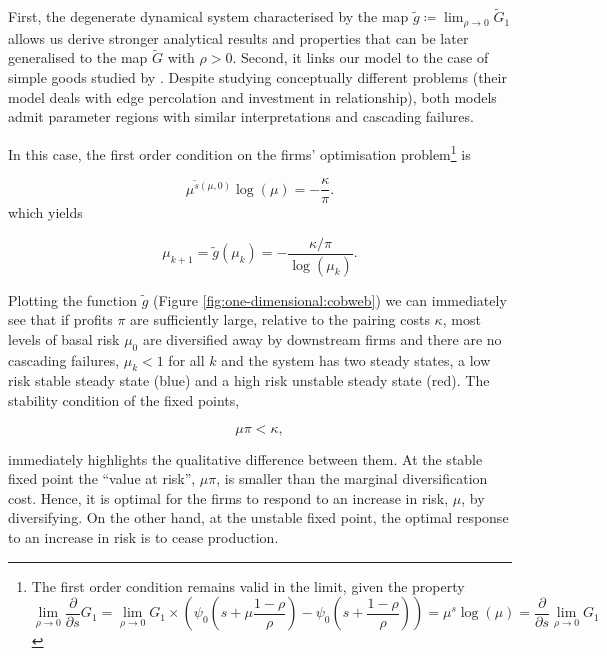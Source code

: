\documentclass[../../main.tex]{subfiles}
\begin{document}
First, the degenerate dynamical system characterised by the map $\tilde{g} \coloneqq \lim_{\rho \to 0} \tilde{G}_1$ allows us derive stronger analytical results and properties that can be later generalised to the map $\tilde{G}$ with $\rho > 0$. Second, it links our model to the case of simple goods studied by . Despite studying conceptually different problems (their model deals with edge percolation and investment in relationship), both models admit parameter regions with similar interpretations and cascading failures.

In this case, the first order condition on the firms' optimisation problem\footnote{
  The first order condition remains valid in the limit, given the property
  \begin{equation}
    \lim_{\rho \rightarrow 0} \frac{\partial}{\partial s}G_1 = \lim_{\rho \rightarrow 0} G_1 \times \left(\psi_0\left(s + \mu \frac{1 - \rho}{\rho} \right) - \psi_0\left(s + \frac{1 - \rho}{\rho} \right) \right) = \mu^{s} \log(\mu) = \frac{\partial}{\partial s} \lim_{\rho \rightarrow 0} G_1
  \end{equation}
} is

\begin{equation} \label{eq:one-dimension:foc}
  \mu^{\tilde{s}(\mu, 0)} \log(\mu) = -\frac{\kappa}{\pi}.
\end{equation} which yields

\begin{equation}
  \mu_{k+1} = \tilde{g}(\mu_k) = -\frac{\kappa / \pi}{\log(\mu_k)}.
\end{equation}

Plotting the function $\tilde{g}$ (Figure \ref{fig:one-dimensional:cobweb}) we can immediately see that if profits $\pi$ are sufficiently large, relative to the pairing costs $\kappa$, most levels of basal risk $\mu_0$ are diversified away by downstream firms and there are no cascading failures, $\mu_k < 1$ for all $k$ and the system has two steady states, a low risk stable steady state (blue) and a high risk unstable steady state (red). The stability condition of the fixed points,

\begin{equation}
  \mu \pi < \kappa,
\end{equation}

immediately highlights the qualitative difference between them. At the stable fixed point the ``value at risk'', $\mu \pi$, is smaller than the marginal diversification cost. Hence, it is optimal for the firms to respond to an increase in risk, $\mu$, by diversifying. On the other hand, at the unstable fixed point, the optimal response to an increase in risk is to cease production.
\end{document}
